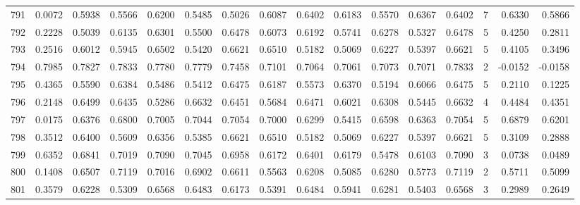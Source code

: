 \begin{tabular}{lrrrrrrrrrrrrrrr}
791 &      0.0072 &  0.5938 &  0.5566 &  0.6200 &  0.5485 &  0.5026 &  0.6087 &  0.6402 &  0.6183 &  0.5570 &   0.6367 &     0.6402 &      7 &                    0.6330 &                     0.5866 \\
792 &      0.2228 &  0.5039 &  0.6135 &  0.6301 &  0.5500 &  0.6478 &  0.6073 &  0.6192 &  0.5741 &  0.6278 &   0.5327 &     0.6478 &      5 &                    0.4250 &                     0.2811 \\
793 &      0.2516 &  0.6012 &  0.5945 &  0.6502 &  0.5420 &  0.6621 &  0.6510 &  0.5182 &  0.5069 &  0.6227 &   0.5397 &     0.6621 &      5 &                    0.4105 &                     0.3496 \\
794 &      0.7985 &  0.7827 &  0.7833 &  0.7780 &  0.7779 &  0.7458 &  0.7101 &  0.7064 &  0.7061 &  0.7073 &   0.7071 &     0.7833 &      2 &                   -0.0152 &                    -0.0158 \\
795 &      0.4365 &  0.5590 &  0.6384 &  0.5486 &  0.5412 &  0.6475 &  0.6187 &  0.5573 &  0.6370 &  0.5194 &   0.6066 &     0.6475 &      5 &                    0.2110 &                     0.1225 \\
796 &      0.2148 &  0.6499 &  0.6435 &  0.5286 &  0.6632 &  0.6451 &  0.5684 &  0.6471 &  0.6021 &  0.6308 &   0.5445 &     0.6632 &      4 &                    0.4484 &                     0.4351 \\
797 &      0.0175 &  0.6376 &  0.6800 &  0.7005 &  0.7044 &  0.7054 &  0.7000 &  0.6299 &  0.5415 &  0.6598 &   0.6363 &     0.7054 &      5 &                    0.6879 &                     0.6201 \\
798 &      0.3512 &  0.6400 &  0.5609 &  0.6356 &  0.5385 &  0.6621 &  0.6510 &  0.5182 &  0.5069 &  0.6227 &   0.5397 &     0.6621 &      5 &                    0.3109 &                     0.2888 \\
799 &      0.6352 &  0.6841 &  0.7019 &  0.7090 &  0.7045 &  0.6958 &  0.6172 &  0.6401 &  0.6179 &  0.5478 &   0.6103 &     0.7090 &      3 &                    0.0738 &                     0.0489 \\
800 &      0.1408 &  0.6507 &  0.7119 &  0.7016 &  0.6902 &  0.6611 &  0.5563 &  0.6208 &  0.5085 &  0.6280 &   0.5773 &     0.7119 &      2 &                    0.5711 &                     0.5099 \\
801 &      0.3579 &  0.6228 &  0.5309 &  0.6568 &  0.6483 &  0.6173 &  0.5391 &  0.6484 &  0.5941 &  0.6281 &   0.5403 &     0.6568 &      3 &                    0.2989 &                     0.2649 \\

\end{tabular}

